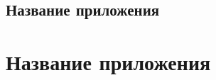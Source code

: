 

\begin{landscape}


\chapter{Название приложения}

\end{landscape}



\chapter{Название приложения}
